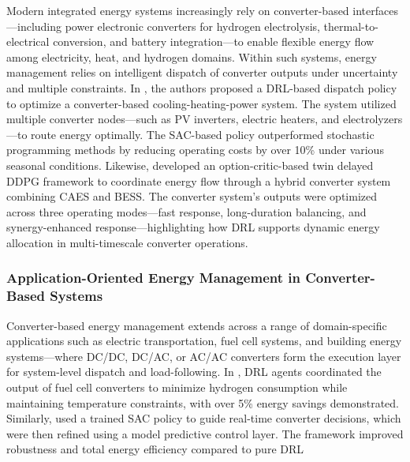 Modern integrated energy systems increasingly rely on converter-based interfaces—including power electronic converters for hydrogen electrolysis, thermal-to-electrical conversion, and battery integration—to enable flexible energy flow among electricity, heat, and hydrogen domains. Within such systems, energy management relies on intelligent dispatch of converter outputs under uncertainty and multiple constraints. In \cite{wang2025energy}, the authors proposed a DRL-based dispatch policy to optimize a converter-based cooling-heating-power system. The system utilized multiple converter nodes—such as PV inverters, electric heaters, and electrolyzers—to route energy optimally. The SAC-based policy outperformed stochastic programming methods by reducing operating costs by over 10\% under various seasonal conditions. Likewise, \cite{cui2024integrated} developed an option-critic-based twin delayed DDPG framework to coordinate energy flow through a hybrid converter system combining CAES and BESS. The converter system's outputs were optimized across three operating modes—fast response, long-duration balancing, and synergy-enhanced response—highlighting how DRL supports dynamic energy allocation in multi-timescale converter operations.

\subsubsection{Application-Oriented Energy Management in Converter-Based Systems}
  
Converter-based energy management extends across a range of domain-specific applications such as electric transportation, fuel cell systems, and building energy systems—where DC/DC, DC/AC, or AC/AC converters form the execution layer for system-level dispatch and load-following. In \cite{jiang2025collaborative}, DRL agents coordinated the output of fuel cell converters to minimize hydrogen consumption while maintaining temperature constraints, with over 5\% energy savings demonstrated. Similarly, \cite{quan2024customized} used a trained SAC policy to guide real-time converter decisions, which were then refined using a model predictive control layer. The framework improved robustness and total energy efficiency compared to pure DRL 

